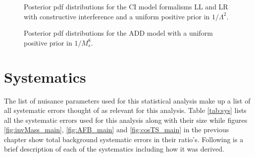 \begin{figure}[h]
\begin{center}
        \end{center}
       \caption{Posterior pdf distributions for the CI model formalisms LL and LR with constructive interference and a uniform positive prior in $1/\Lambda^{2}$.}
       \label{fig:pdf_CI_main}
    \end{figure}

    \begin{figure}[h]
        \begin{center}
        \end{center}
       \caption{Posterior pdf distributions for the ADD model with a uniform positive prior in $1/M_{s}^{8}$.}
       \label{fig:pdf_ADD_main}
    \end{figure}



\section{Systematics}
    \label{sec:sys}

    The list of nuisance parameters used for this statistical analysis make up a list of all systematic errors thought of as relevant for this analysis. Table \ref{tab:sys} lists all the systematic errors used for this analysis along with their size while figures \ref{fig:invMass_main}, \ref{fig:AFB_main} and \ref{fig:cosTS_main} in the previous chapter show total background systematic errors in their ratio's. Following is a brief description of each of the systematics including how it was derived.

